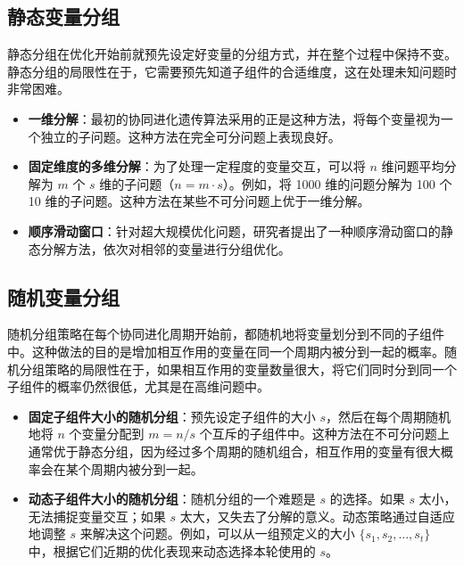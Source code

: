 \subsection{静态变量分组}
静态分组在优化开始前就预先设定好变量的分组方式，并在整个过程中保持不变。静态分组的局限性在于，它需要预先知道子组件的合适维度，这在处理未知问题时非常困难。
    \begin{itemize}
        \item \textbf{一维分解}：最初的协同进化遗传算法采用的正是这种方法，将每个变量视为一个独立的子问题。这种方法在完全可分问题上表现良好。
        \item \textbf{固定维度的多维分解}：为了处理一定程度的变量交互，可以将 $n$ 维问题平均分解为 $m$ 个 $s$ 维的子问题（$n = m \cdot s$）。例如，将 1000 维的问题分解为 100 个 10 维的子问题。这种方法在某些不可分问题上优于一维分解。
        \item \textbf{顺序滑动窗口}：针对超大规模优化问题，研究者提出了一种顺序滑动窗口的静态分解方法，依次对相邻的变量进行分组优化。
    \end{itemize}

\subsection{随机变量分组}
随机分组策略在每个协同进化周期开始前，都随机地将变量划分到不同的子组件中。这种做法的目的是增加相互作用的变量在同一个周期内被分到一起的概率。随机分组策略的局限性在于，如果相互作用的变量数量很大，将它们同时分到同一个子组件的概率仍然很低，尤其是在高维问题中。
        \begin{itemize}
            \item \textbf{固定子组件大小的随机分组}：预先设定子组件的大小 $s$，然后在每个周期随机地将 $n$ 个变量分配到 $m = n / s$ 个互斥的子组件中。这种方法在不可分问题上通常优于静态分组，因为经过多个周期的随机组合，相互作用的变量有很大概率会在某个周期内被分到一起。
            \item \textbf{动态子组件大小的随机分组}：随机分组的一个难题是 $s$ 的选择。如果 $s$ 太小，无法捕捉变量交互；如果 $s$ 太大，又失去了分解的意义。动态策略通过自适应地调整 $s$ 来解决这个问题。例如，可以从一组预定义的大小 $\{s_1, s_2, \dots, s_t\}$ 中，根据它们近期的优化表现来动态选择本轮使用的 $s$。
        \end{itemize}

